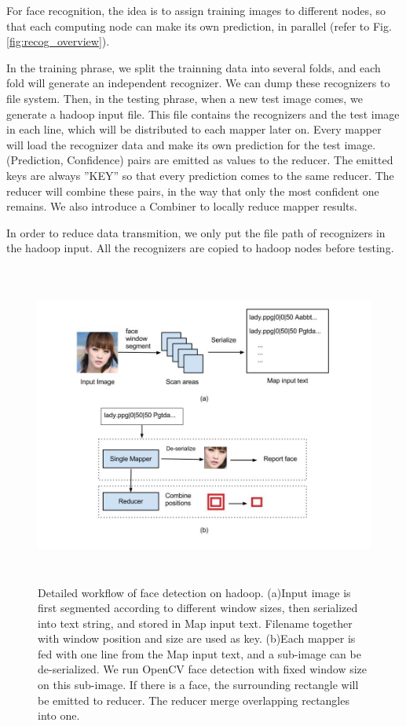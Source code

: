 \documentclass[11pt, draftclsnofoot, onecolumn]{IEEEtran}
\begin{document}
For face recognition, the idea is to assign training images to different nodes, so that each computing node can make its own prediction, in parallel (refer to Fig.\ref{fig:recog_overview}). 

In the training phrase, we split the trainning data into several folds, and each fold will generate an independent recognizer. We can dump these recognizers to file system. Then, in the testing phrase, when a new test image comes, we generate a hadoop input file. This file contains the recognizers and the test image in each line, which will be distributed to each mapper later on. Every mapper will load the recognizer data and make its own prediction for the test image. (Prediction, Confidence) pairs are emitted as values to the reducer. The emitted keys are always ''KEY'' so that every prediction comes to the same reducer. The reducer will combine these pairs, in the way that only the most confident one remains. We also introduce a Combiner to locally reduce mapper results.

In order to reduce data transmition, we only put the file path of recognizers in the hadoop input. All the recognizers are copied to hadoop nodes before testing.

\begin{figure}
\centering
\includegraphics[height=300pt]{hadoop_face_detection}
\caption{Detailed workflow of face detection on hadoop. (a)Input image is first segmented according to different window sizes, then serialized into text string, and stored in Map input text. Filename together with window position and size are used as key. (b)Each mapper is fed with one line from the Map input text, and a sub-image can be de-serialized. We run OpenCV face detection with fixed window size on this sub-image. If there is a face, the surrounding rectangle will be emitted to reducer. The reducer merge overlapping rectangles into one.}
\label{fig:hadoop_face_detection}
\end{figure}
\end{document}
